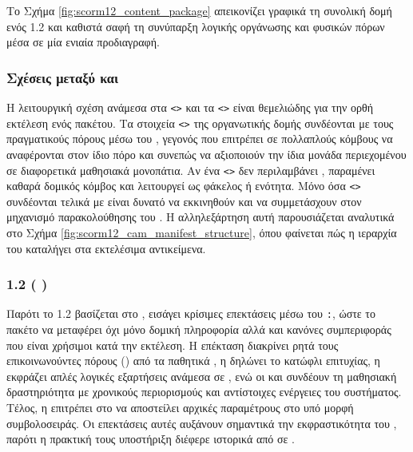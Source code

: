 Το Σχήμα \ref{fig:scorm12_content_package} απεικονίζει γραφικά τη συνολική δομή ενός  1.2  και καθιστά σαφή τη συνύπαρξη λογικής οργάνωσης και φυσικών πόρων μέσα σε μία ενιαία προδιαγραφή.



\subsubsection{Σχέσεις μεταξύ  και }

Η λειτουργική σχέση ανάμεσα στα \texttt{<>} και τα \texttt{<>} είναι θεμελιώδης για την ορθή εκτέλεση ενός πακέτου. Τα στοιχεία \texttt{<>} της οργανωτικής δομής συνδέονται με τους πραγματικούς πόρους μέσω του \texttt{}, γεγονός που επιτρέπει σε πολλαπλούς κόμβους να αναφέρονται στον ίδιο πόρο και συνεπώς να αξιοποιούν την ίδια μονάδα περιεχομένου σε διαφορετικά μαθησιακά μονοπάτια. Αν ένα \texttt{<>} δεν περιλαμβάνει \texttt{}, παραμένει καθαρά δομικός κόμβος και λειτουργεί ως φάκελος ή ενότητα. Μόνο όσα \texttt{<>} συνδέονται τελικά με  είναι δυνατό να εκκινηθούν και να συμμετάσχουν στον μηχανισμό παρακολούθησης του . Η αλληλεξάρτηση αυτή παρουσιάζεται αναλυτικά στο Σχήμα \ref{fig:scorm12_cam_manifest_structure}, όπου φαίνεται πώς η ιεραρχία του  καταλήγει στα εκτελέσιμα αντικείμενα.



\subsubsection{ 1.2  ( )}

Παρότι το  1.2 βασίζεται στο   , εισάγει κρίσιμες επεκτάσεις μέσω του  \texttt{:}, ώστε το πακέτο να μεταφέρει όχι μόνο δομική πληροφορία αλλά και κανόνες συμπεριφοράς που είναι χρήσιμοι κατά την εκτέλεση. Η επέκταση \texttt{} διακρίνει ρητά τους επικοινωνούντες πόρους () από τα παθητικά , η \texttt{} δηλώνει το κατώφλι επιτυχίας, η \texttt{} εκφράζει απλές λογικές εξαρτήσεις ανάμεσα σε , ενώ οι \texttt{} και \texttt{} συνδέουν τη μαθησιακή δραστηριότητα με χρονικούς περιορισμούς και αντίστοιχες ενέργειες του συστήματος. Τέλος, η \texttt{} επιτρέπει στο  να αποστείλει αρχικές παραμέτρους στο  υπό μορφή συμβολοσειράς. Οι επεκτάσεις αυτές αυξάνουν σημαντικά την εκφραστικότητα του , παρότι η πρακτική τους υποστήριξη διέφερε ιστορικά από  σε .

